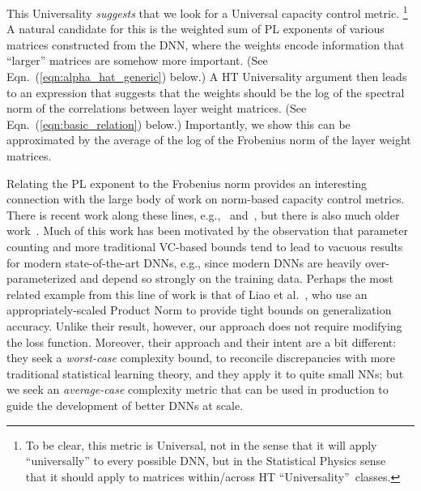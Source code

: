This Universality \emph{suggests} that we look for a Universal capacity control metric.%
\footnote{To be clear, this metric is Universal, not in the sense that it will apply ``universally'' to every possible DNN, but in the Statistical Physics sense~\cite{SornetteBook,BouchaudPotters03} that it should apply to matrices within/across HT ``Universality''~classes.}
A natural candidate for this is the weighted sum of PL exponents of various matrices constructed from the DNN, where the weights encode information that ``larger'' matrices are somehow more important.
(See Eqn.~(\ref{eqn:alpha_hat_generic}) below.)
A HT Universality argument then leads to an expression that suggests that the weights should be the log of the spectral norm of the correlations between layer weight matrices.
(See Eqn.~(\ref{eqn:basic_relation}) below.)
Importantly, we show this can be approximated by the average of the log of the Frobenius norm of the layer weight matrices.

Relating the 
PL exponent to the Frobenius norm provides an interesting connection with the large body of work on norm-based capacity control metrics. 
There is recent work along these lines, e.g.,~\cite{LMBx18_TR, SHNx17_TR,PLMx18_TR} and~\cite{NTS14_TR,NTS15,NBMS17_TR,BFT17_TR,YM17_TR,KKB17_TR,NBS17_TR,AGNZ18_TR,ACH18_TR,ZF18_TR},
but there is also much older work~\cite{Bar97,MN09_TR}.
Much of this work has been motivated by the observation that parameter counting and more traditional VC-based bounds tend to lead to vacuous results for modern state-of-the-art DNNs, e.g., since modern DNNs are heavily over-parameterized and depend so strongly on the training data.
Perhaps the most related example from this line of work is that of Liao et al.~\cite{LMBx18_TR}, who use an appropriately-scaled Product Norm to provide tight bounds on generalization accuracy.
Unlike their result, however, our approach does not require modifying the loss function.
Moreover, their approach and their intent are a bit different: they seek a \emph{worst-case} complexity bound, to reconcile discrepancies with more traditional statistical learning theory, and they apply it to quite small NNs; but we seek an \emph{average-case} complexity metric that can be used in production to guide the development of better DNNs at scale.

